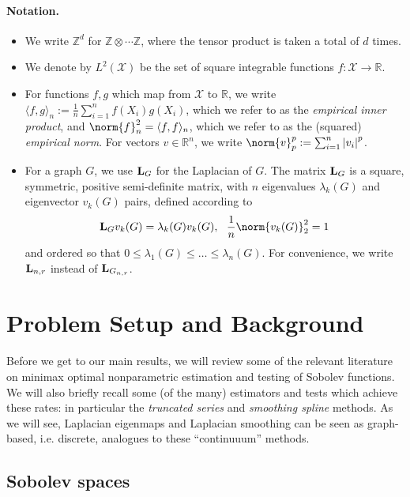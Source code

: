\documentclass{article}
\newcommand{\Reals}{\mathbb{R}}
\newcommand{\abs}[1]{\left \lvert #1 \right \rvert}
\newcommand{\1}{\mathbf{1}}
\newcommand{\Lap}{{\bf L}}
\newcommand{\Xset}{\mathcal{X}}
\newcommand{\Leb}{L}
\newcommand{\dotp}[2]{\langle #1, #2 \rangle}
\theoremstyle{alden}
\theoremstyle{aldenthm}
\theoremstyle{definition}
\theoremstyle{remark}
\begin{document}
\paragraph{Notation.}
\begin{itemize}
	\item We write $\mathbb{Z}^d$ for $\mathbb{Z} \otimes \cdots \mathbb{Z}$, where the tensor product is taken a total of $d$ times.
	\item We denote by $\Leb^2(\Xset)$ be the set of square integrable functions $f:\Xset \to \Reals$.
	\item For functions $f,g$ which map from $\Xset$ to $\Reals$, we write $\dotp{f}{g}_n := \frac{1}{n}\sum_{i = 1}^{n} f(X_i) g(X_i)$, which we refer to as the \emph{empirical inner product}, and $\norm{f}_n^2 = \dotp{f}{f}_n$, which we refer to as the (squared) \emph{empirical norm}. For vectors $v \in \Reals^n$, we write $\norm{v}_p^p := \sum_{i = 1}^{n} \abs{v_i}^p$.
	\item For a graph $G$, we use $\Lap_G$ for the Laplacian of $G$. The matrix $\Lap_G$ is a square, symmetric, positive semi-definite matrix, with $n$ eigenvalues $\lambda_k(G)$ and eigenvector $v_k(G)$ pairs, defined according to
	\begin{equation*}
	\Lap_G v_k(G) = \lambda_k(G) v_k(G), ~~\frac{1}{n} \norm{v_k(G)}_2^2 = 1 
	\end{equation*}
	and ordered so that $0 \leq \lambda_1(G) \leq \ldots \leq \lambda_n(G)$. For convenience, we write $\Lap_{n,r}$ instead of $\Lap_{G_{n,r}}$. 
\end{itemize}

\section{Problem Setup and Background}
\label{sec:problem_setup_and_background}

Before we get to our main results, we will review some of the relevant literature on minimax optimal nonparametric estimation and testing of Sobolev functions. We will also briefly recall some (of the many) estimators and tests which achieve these rates: in particular the \emph{truncated series} and \emph{smoothing spline} methods. As we will see, Laplacian eigenmaps and Laplacian smoothing can be seen as graph-based, i.e. discrete, analogues to these ``continuuum'' methods.

\subsection{Sobolev spaces}
\label{subsec:sobolev_spaces}
\end{document}
